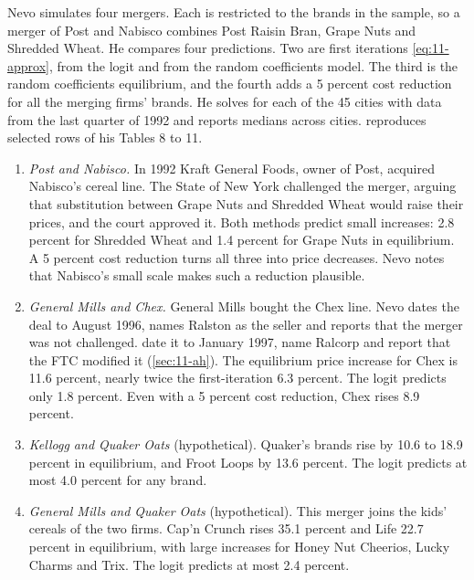 Nevo simulates four mergers. Each is restricted to the brands in the sample, so a merger of
Post and Nabisco combines Post Raisin Bran, Grape Nuts and Shredded Wheat. He compares four predictions. Two are first iterations \eqref{eq:11-approx}, from the logit and from the
random coefficients model. The third is the random coefficients equilibrium, and the fourth adds a 5 percent cost
reduction for all the merging firms' brands. He solves for each of the 45 cities
with data from the last quarter of 1992 and reports medians across cities.  reproduces selected
rows of his Tables 8 to 11.

\begin{enumerate}[label=(\alph*)]
\item \emph{Post and Nabisco.} In 1992 Kraft General Foods, owner of Post, acquired Nabisco's cereal line. The State of
      New York challenged the merger, arguing that substitution between Grape Nuts and Shredded Wheat would raise their
      prices, and the court approved it. Both methods predict small increases: 2.8 percent for Shredded Wheat and 1.4
      percent for Grape Nuts in equilibrium. A 5 percent cost reduction turns all three into price decreases. Nevo
      notes that Nabisco's small scale makes such a reduction plausible.
\item \emph{General Mills and Chex.} General Mills bought the Chex line. Nevo dates the deal to August 1996, names
      Ralston as the seller and reports that the merger was not challenged. \citet{AshenfelterHosken2008} date it to
      January 1997, name Ralcorp and report that the FTC modified it (\cref{sec:11-ah}). The equilibrium price increase for Chex is 11.6 percent, nearly twice the first-iteration 6.3 percent.
      The logit predicts only 1.8 percent. Even with a 5 percent cost reduction, Chex rises 8.9 percent.
\item \emph{Kellogg and Quaker Oats} (hypothetical). Quaker's brands rise by 10.6 to 18.9 percent in equilibrium, and
      Froot Loops by 13.6 percent. The logit predicts at most 4.0 percent for any brand.
\item \emph{General Mills and Quaker Oats} (hypothetical). This merger joins the kids' cereals of the two firms. Cap'n
      Crunch rises 35.1 percent and Life 22.7 percent in equilibrium, with large increases for Honey Nut Cheerios,
      Lucky Charms and Trix. The logit predicts at most 2.4 percent.
\end{enumerate}

